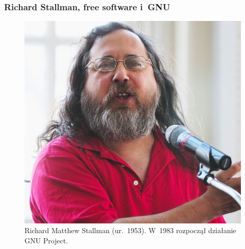 \documentclass[10pt,t]{beamer}
\begin{document}
\begin{frame}
  \frametitle{Richard Stallman, free software i~GNU}


  \begin{figure}

    \centering


    \includegraphics[scale=0.35]
    {./PresentationsPictures/OS-heroes-Pictures/Richard-Stallman.jpeg}

    \caption{Richard Matthew Stallman (ur.~1953). W~1983 rozpoczął działanie
      GNU Project.}

    \label{fig:Richard-M-Stallman}

  \end{figure}

\end{frame}
\end{document}
